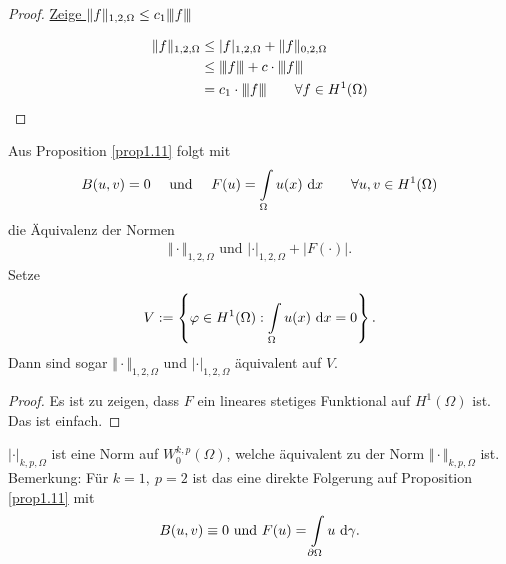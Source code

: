 \begin{proof}
	\underline{Zeige $\|f\|_{1,2,\Omega}\leq c_1 {\left\vert\kern-0.25ex\left\vert\kern-0.25ex\left\vert f \right\vert\kern-0.25ex\right\vert\kern-0.25ex\right\vert}$}

	\begin{align*}
		\Vert f\Vert_{1,2,\Omega}
		&\leq
		|f|_{1,2,\Omega}+\Vert f\Vert_{0,2,\Omega}\\
		&\leq
		{\left\vert\kern-0.25ex\left\vert\kern-0.25ex\left\vert f \right\vert\kern-0.25ex\right\vert\kern-0.25ex\right\vert}+c\cdot{\left\vert\kern-0.25ex\left\vert\kern-0.25ex\left\vert f \right\vert\kern-0.25ex\right\vert\kern-0.25ex\right\vert}\\
		&=c_1\cdot{\left\vert\kern-0.25ex\left\vert\kern-0.25ex\left\vert f \right\vert\kern-0.25ex\right\vert\kern-0.25ex\right\vert}\qquad\forall f\in H^1(\Omega)
	\end{align*}
\end{proof}

\begin{korollar}\label{korollarPoincareUngleichung}\enter %
	Aus Proposition \ref{prop1.11} folgt mit
	\begin{align*}
		B(u,v)=0\quad\text{ und }\quad F(u)=\int\limits_\Omega u(x)\text{ d} x
		\qquad\forall u,v\in H^1(\Omega)
	\end{align*}
	die Äquivalenz der Normen
	\begin{align*}
		\Vert\cdot\Vert_{1,2,\Omega}\text{ und } |\cdot|_{1,2,\Omega}+|F(\cdot)|.
	\end{align*}
	Setze
	\begin{align*}
		V:=\left\lbrace\varphi\in H^1(\Omega):\int\limits_\Omega u(x)\text{ d} x=0\right\rbrace.
	\end{align*}
	Dann sind sogar $\Vert\cdot\Vert_{1,2,\Omega}$ und $|\cdot|_{1,2,\Omega}$ äquivalent auf $V$.
\end{korollar}

\begin{proof}
	Es ist zu zeigen, dass $F$ ein lineares stetiges Funktional auf $H^1(\Omega)$  ist. Das ist einfach.
\end{proof}

\begin{proposition}\label{prop1.13FriedrichsUngleichung}\enter
	$|\cdot|_{k,p,\Omega}$ ist eine Norm auf $W_0^{k,p}(\Omega)$, welche äquivalent zu der Norm $\Vert\cdot\Vert_{k,p,\Omega}$ ist.\nl
	Bemerkung: Für $k=1,~p=2$ ist das eine direkte Folgerung auf Proposition \ref{prop1.11} mit 
	\begin{align*}
		B(u,v)\equiv0\text{ und } F(u)=\int\limits_{\partial\Omega} u\text{ d} \gamma.
	\end{align*}
\end{proposition}

